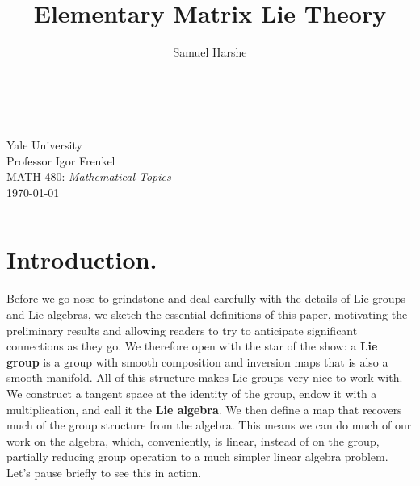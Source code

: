 \documentclass[12pt]{article}
\title{Elementary Matrix Lie Theory}
\author{Samuel Harshe}
\theoremstyle{definition}
\theoremstyle{definition}
\theoremstyle{definition}
\theoremstyle{definition}
\theoremstyle{definition}
\theoremstyle{definition}
\theoremstyle{definition}
\theoremstyle{definition}
\begin{document}
\makeatletter
\begin{titlepage}
    \begin{center}
        \vspace*{2.5in}
        {\selectfont \huge
        \bfseries \@title}\\
        \vspace*{2.5in}
        \onehalfspacing%
        \@author\\
        Yale University\\
        Professor Igor Frenkel\\
        MATH 480: \textit{Mathematical Topics} \\
        \today \\
    \end{center}
\end{titlepage}

\onehalfspacing%
\tableofcontents
\vspace{6pt}
\noindent\rule{\textwidth}{0.5pt}

\vspace{-16pt}
\section{Introduction.}
\par{Before we go nose-to-grindstone and deal
carefully with the details of Lie groups and Lie
algebras, we sketch the essential definitions of
this paper, motivating the preliminary results and
allowing readers to try to anticipate significant
connections as they go. We therefore open with the
star of the show: a \textbf{Lie group} is a group
with smooth composition and inversion maps that is
also a smooth manifold. All of this structure
makes Lie groups very nice to work with. We
construct a tangent space at the identity of the
group, endow it with a multiplication, and call it
the \textbf{Lie algebra}. We then define a map
that recovers much of the group structure from the
algebra. This means we can do much of our work on
the algebra, which, conveniently, is linear,
instead of on the group, partially reducing group
operation to a much simpler linear algebra
problem. Let’s pause briefly to see this in
action.}
\end{document}
